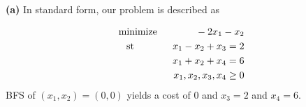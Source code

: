 \documentclass[12pt]{article}
\newenvironment{problem}[2][Problem]{\begin{trivlist}
\item[\hskip \labelsep {\bfseries #1}\hskip \labelsep {\bfseries #2.}]}{\end{trivlist}}
\newenvironment{subproblem}[1]{\textbf{(#1)}}{}
\theoremstyle{definition}
\begin{document}
\begin{problem}{3.12}

\begin{subproblem}{a}
In standard form, our problem is described as

\begin{align*}
\text{minimize \hspace{0.5in}} -2x_1-x_2 \\
\text{st \hspace{0.5in}} x_1-x_2+x_3 = 2 \\
x_1 + x_2 + x_4 = 6 \\
x_1, x_2, x_3, x_4 \geq 0
\end{align*}
BFS of $(x_1, x_2) = (0, 0)$ yields a cost of 0 and $x_3 = 2$ and $x_4 = 6$.
\end{subproblem}


\end{problem}
\end{document}
